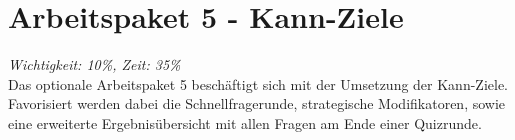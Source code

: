 \documentclass[11pt,a4paper]{scrreprt}
\begin{document}
\section{Arbeitspaket 5 - Kann-Ziele} \textit{Wichtigkeit: 10\%, Zeit: 35\%} \\
Das optionale Arbeitspaket 5 beschäftigt sich mit der Umsetzung der Kann-Ziele. Favorisiert werden dabei die Schnellfragerunde, strategische Modifikatoren, sowie eine erweiterte Ergebnisübersicht mit allen Fragen am Ende einer Quizrunde.
\end{document}
